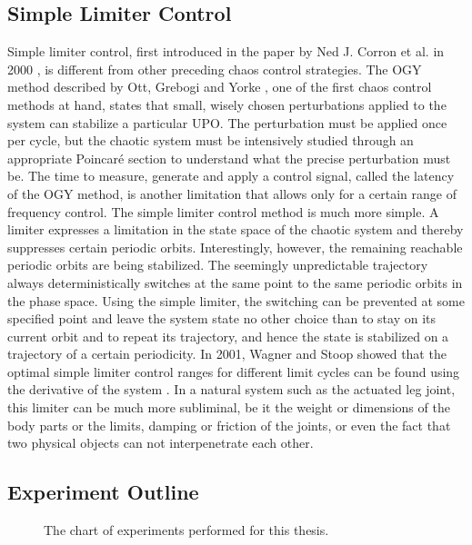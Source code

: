 \documentclass[main]{subfiles}
\begin{document}
\subsection{Simple Limiter Control}

Simple limiter control, first introduced in the paper by Ned J. Corron et al. in 2000 \cite{bib:Corron2000}, is different from other preceding chaos control strategies. %
%
The OGY method described by Ott, Grebogi and Yorke \cite{bib:Ott1990}, one of the first chaos control methods at hand, states that small, wisely chosen perturbations applied to the system can stabilize a particular UPO. %
%
The perturbation must be applied once per cycle, but the chaotic system must be intensively studied through an appropriate Poincaré section to understand what the precise perturbation must be. %
%
The time to measure, generate and apply a control signal, called the latency of the OGY method, is another limitation that allows only for a certain range of frequency control. %
%
The simple limiter control method is much more simple. A limiter expresses a limitation in the state space of the chaotic system and thereby suppresses certain periodic orbits. %
%
%
Interestingly, however, the remaining reachable periodic orbits are being stabilized. %
%
The seemingly unpredictable trajectory always deterministically switches at the same point to the same periodic orbits in the phase space. %
%
Using the simple limiter, the switching can be prevented at some specified point and leave the system state no other choice than to stay on its current orbit and to repeat its trajectory, and hence the state is stabilized on a trajectory of a certain periodicity. %
%
In 2001, Wagner and Stoop showed that the optimal simple limiter control ranges for different limit cycles can be found using the derivative of the system \cite{bib:Wagner2001}. %
%
In a natural system such as the actuated leg joint, this limiter can be much more subliminal, be it the weight or dimensions of the body parts or the limits, damping or friction of the joints, or even the fact that two physical objects can not interpenetrate each other. %
%

\subsection{Experiment Outline}

\begin{figure}[H]
\centering


\caption[The experiments chart]{The chart of experiments performed for this thesis.}
\label{figure:experiments-chart}
\end{figure}
\end{document}
